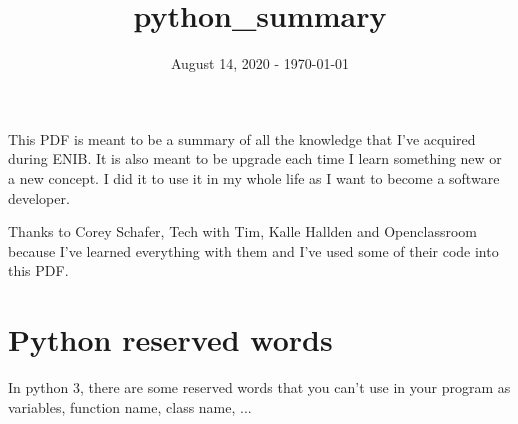\documentclass[a4paper, 12pt, titlepage]{scrartcl} %
\title{python\_summary}
\author{}
\date{August 14, 2020 - \today}
\begin{document}
\maketitle
\newpage

This PDF is meant to be a summary of all the knowledge that I've acquired during ENIB. It is also meant to be upgrade each time I learn something new or a new concept. I did it to use it in my whole life as I want to become a software developer.

\vspace{10mm}

Thanks to Corey Schafer, Tech with Tim, Kalle Hallden and Openclassroom because I've learned everything with them and I've used some of their code into this PDF.

\newpage

\tableofcontents

\newpage
\section{Python reserved words}
In python 3, there are some reserved words that you can't use in your program as variables, function name, class name, ...

\vspace{35mm}
\end{document}
